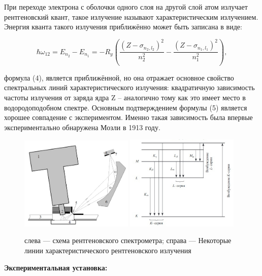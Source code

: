 \documentclass[a4paper, 12pt]{article}%
\begin{document}
	
	При переходе электрона с оболочки одного слоя на другой слой атом
	излучает рентгеновский квант, такое излучение называют характеристическим излучением. Энергия кванта такого излучения приближённо
	может быть записана в виде:
	
	\begin{equation}
		\hbar \omega_{12}=E_{n_2}-E_{n_1}=-R_y\left(\frac{\left(Z-\sigma_{n_2, l_2}\right)^2}{n_2^2}-\frac{\left(Z-\sigma_{n_1, l_1}\right)^2}{n_1^2}\right),
	\end{equation}

	формула (4), является приближённой,
	но она отражает основное свойство спектральных линий характеристического излучения: квадратичную зависимость частоты излучения от заряда ядра Z – аналогично тому как это имеет место в водородоподобном спектре. Основным подтверждением формулы (5) является
	хорошее совпадение с экспериментом. Именно такая зависимость
	была впервые экспериментально обнаружена Мозли в 1913 году.\\
	
	
	
		\begin{figure}[H]
		\centering
		\includegraphics[width=0.48\textwidth]{ust}
		\hfill
		\includegraphics[width=0.48\textwidth]{spectr}
		\caption{слева --- схема рентгеновского спектрометра; справа --- Некоторые линии характеристического рентгеновского излучения}
		\label{pic:scheme}
	\end{figure}
	\textbf{Экспериментальная установка: }\\
	
\end{document}

